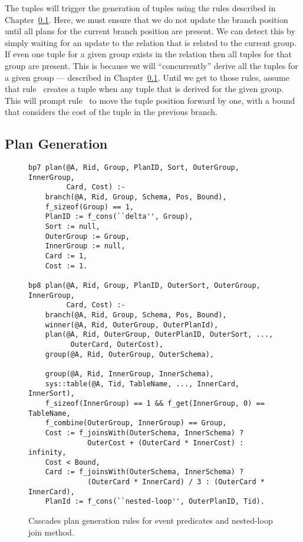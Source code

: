 The  tuples will trigger the generation of  tuples using
the rules described in Chapter~\ref{ch:opt:sec:cascades_plan}.  Here, we must
ensure that we do not update the branch position until all plans for the
current branch position are present.  We can detect this by simply waiting for
an update to the  relation that is related to the current 
group.  If even one  tuple for a given group exists in the 
relation then all  tuples for that group are present.  This is because
we will ``concurrently'' derive all the  tuples for a given group ---
described in Chapter~\ref{ch:opt:sec:cascades_plan}.  Until we get to those
rules, assume that rule~ creates a  tuple when any
 tuple that is derived for the given group.  This will prompt
rule~ to move the  tuple position forward by one, with a
bound that considers the cost of the  tuple in the previous branch.

\subsection{Plan Generation}
\label{ch:opt:sec:cascades_plan}

\begin{figure*}
\ssp
\centering
\begin{lstlisting}
bp7 plan(@A, Rid, Group, PlanID, Sort, OuterGroup, InnerGroup, 
         Card, Cost) :-
    branch(@A, Rid, Group, Schema, Pos, Bound),
    f_sizeof(Group) == 1,
    PlanID := f_cons(``delta'', Group),
    Sort := null,
    OuterGroup := Group,
    InnerGroup := null,
    Card := 1,
    Cost := 1.

bp8 plan(@A, Rid, Group, PlanID, OuterSort, OuterGroup, InnerGroup, 
         Card, Cost) :-
    branch(@A, Rid, Group, Schema, Pos, Bound),
    winner(@A, Rid, OuterGroup, OuterPlanId),
    plan(@A, Rid, OuterGroup, OuterPlanID, OuterSort, ..., 
          OuterCard, OuterCost),
    group(@A, Rid, OuterGroup, OuterSchema),

    group(@A, Rid, InnerGroup, InnerSchema),
    sys::table(@A, Tid, TableName, ..., InnerCard, InnerSort),
    f_sizeof(InnerGroup) == 1 && f_get(InnerGroup, 0) == TableName,
    f_combine(OuterGroup, InnerGroup) == Group,
    Cost := f_joinsWith(OuterSchema, InnerSchema) ?
              OuterCost + (OuterCard * InnerCost) : infinity,
    Cost < Bound,
    Card := f_joinsWith(OuterSchema, InnerSchema) ?
              (OuterCard * InnerCard) / 3 : (OuterCard * InnerCard),
    PlanId := f_cons(``nested-loop'', OuterPlanID, Tid).
\end{lstlisting}
\caption{\label{ch:opt:fig:cascades_plan1} Cascades plan generation rules for event
predicates and nested-loop join method.}
\end{figure*}

